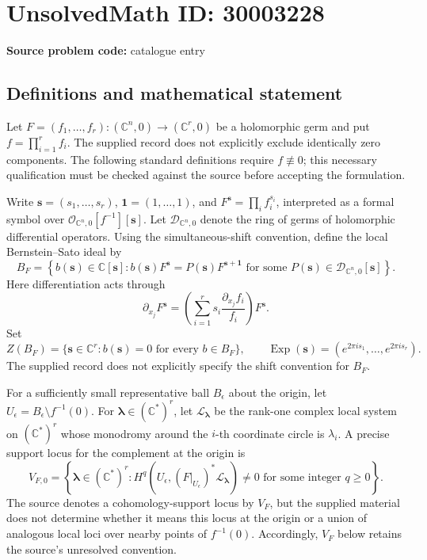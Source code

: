 \documentclass[11pt]{article}
\newcommand{\C}{\mathbb{C}}
\begin{document}
\section*{UnsolvedMath ID: 30003228}
\textbf{Source problem code:} catalogue entry
\subsection{Definitions and mathematical statement}
Let \(F=(f_1,\ldots,f_r):(\C^n,0)\to(\C^r,0)\) be a holomorphic germ and put \(f=\prod_{i=1}^r f_i\). The supplied record does not explicitly exclude identically zero components. The following standard definitions require \(f\not\equiv0\); this necessary qualification must be checked against the source before accepting the formulation.

Write \(\mathbf s=(s_1,\ldots,s_r)\), \(\mathbf1=(1,\ldots,1)\), and \(F^{\mathbf s}=\prod_i f_i^{s_i}\), interpreted as a formal symbol over \(\mathcal O_{\C^n,0}[f^{-1}][\mathbf s]\). Let \(\mathcal D_{\C^n,0}\) denote the ring of germs of holomorphic differential operators. Using the simultaneous-shift convention, define the local Bernstein--Sato ideal by
\[
 B_F=\left\{b(\mathbf s)\in\C[\mathbf s]:
 b(\mathbf s)F^{\mathbf s}=P(\mathbf s)F^{\mathbf s+\mathbf1}
 \text{ for some }P(\mathbf s)\in\mathcal D_{\C^n,0}[\mathbf s]\right\}.
\]
Here differentiation acts through
\[
 \partial_{x_j}F^{\mathbf s}
 =\left(\sum_{i=1}^r s_i\frac{\partial_{x_j}f_i}{f_i}\right)F^{\mathbf s}.
\]
Set
\[
 Z(B_F)=\{\mathbf s\in\C^r:b(\mathbf s)=0\text{ for every }b\in B_F\},
 \qquad
 \operatorname{Exp}(\mathbf s)=(e^{2\pi i s_1},\ldots,e^{2\pi i s_r}).
\]
The supplied record does not explicitly specify the shift convention for \(B_F\).

For a sufficiently small representative ball \(B_\epsilon\) about the origin, let \(U_\epsilon=B_\epsilon\setminus f^{-1}(0)\). For \(\boldsymbol\lambda\in(\C^*)^r\), let \(\mathcal L_{\boldsymbol\lambda}\) be the rank-one complex local system on \((\C^*)^r\) whose monodromy around the \(i\)-th coordinate circle is \(\lambda_i\). A precise support locus for the complement at the origin is
\[
 V_{F,0}=\left\{\boldsymbol\lambda\in(\C^*)^r:
 H^q\!\left(U_\epsilon,(F|_{U_\epsilon})^*\mathcal L_{\boldsymbol\lambda}\right)\ne0
 \text{ for some integer }q\ge0\right\}.
\]
The source denotes a cohomology-support locus by \(V_F\), but the supplied material does not determine whether it means this locus at the origin or a union of analogous local loci over nearby points of \(f^{-1}(0)\). Accordingly, \(V_F\) below retains the source's unresolved convention.
\end{document}

